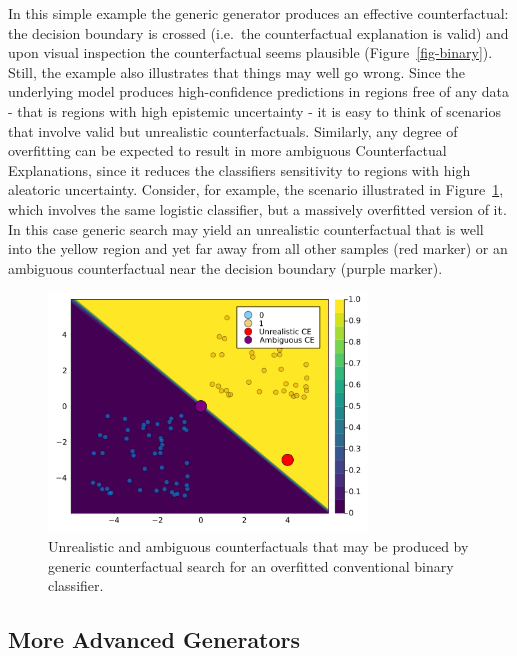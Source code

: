 \documentclass{juliacon}
\begin{document}
In this simple example the generic generator produces an effective
counterfactual: the decision boundary is crossed (i.e.~the
counterfactual explanation is valid) and upon visual inspection the
counterfactual seems plausible (Figure~\ref{fig-binary}). Still, the
example also illustrates that things may well go wrong. Since the
underlying model produces high-confidence predictions in regions free of
any data - that is regions with high epistemic uncertainty - it is easy
to think of scenarios that involve valid but unrealistic
counterfactuals. Similarly, any degree of overfitting can be expected to
result in more ambiguous Counterfactual Explanations, since it reduces
the classifiers sensitivity to regions with high aleatoric uncertainty.
Consider, for example, the scenario illustrated in
Figure~\ref{fig-binary-wrong}, which involves the same logistic
classifier, but a massively overfitted version of it. In this case
generic search may yield an unrealistic counterfactual that is well into
the yellow region and yet far away from all other samples (red marker)
or an ambiguous counterfactual near the decision boundary (purple
marker).

\begin{figure}

{\centering \includegraphics[width=3.33333in,height=2.5in]{www/binary_wrong.png}

}

\caption{\label{fig-binary-wrong}Unrealistic and ambiguous
counterfactuals that may be produced by generic counterfactual search
for an overfitted conventional binary classifier.}

\end{figure}

\hypertarget{more-advanced-generators}{%
\subsection{More Advanced Generators}\label{more-advanced-generators}}
\end{document}

